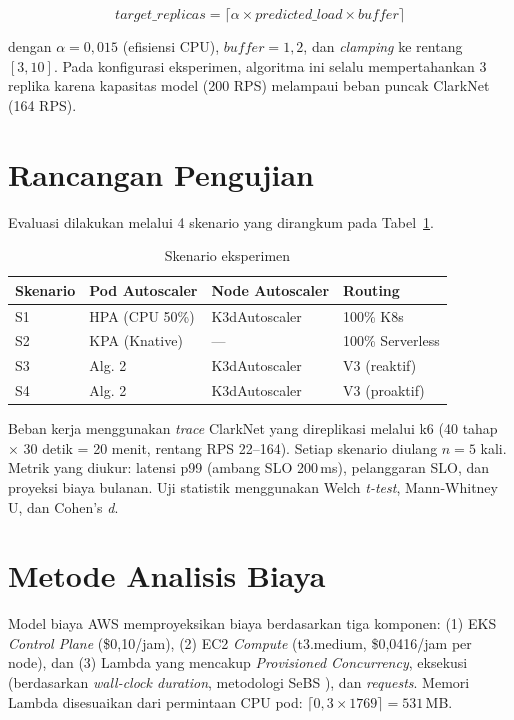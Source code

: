 \begin{equation}
    target\_replicas = \lceil \alpha \times predicted\_load \times buffer \rceil
\end{equation}

dengan $\alpha = 0,015$ (efisiensi CPU), $buffer = 1,2$, dan \emph{clamping} ke rentang $[3, 10]$. Pada konfigurasi eksperimen, algoritma ini selalu mempertahankan 3 replika karena kapasitas model (200 RPS) melampaui beban puncak ClarkNet (164 RPS).

\section{Rancangan Pengujian}
\label{sec:rancangan-pengujian}

Evaluasi dilakukan melalui 4 skenario yang dirangkum pada Tabel~\ref{tab:skenario-eksperimen}.

\begin{table}[htbp]
    \centering
    \caption{Skenario eksperimen}
    \label{tab:skenario-eksperimen}
    \begin{tabular}{llll}
        \toprule
        Skenario & Pod Autoscaler & Node Autoscaler & Routing \\
        \midrule
        S1 & HPA (CPU 50\%) & K3dAutoscaler & 100\% K8s \\
        S2 & KPA (Knative) & --- & 100\% Serverless \\
        S3 & Alg. 2 & K3dAutoscaler & V3 (reaktif) \\
        S4 & Alg. 2 & K3dAutoscaler & V3 (proaktif) \\
        \bottomrule
    \end{tabular}
\end{table}

Beban kerja menggunakan \emph{trace} ClarkNet yang direplikasi melalui k6 (40 tahap $\times$ 30 detik = 20 menit, rentang RPS 22--164). Setiap skenario diulang $n = 5$ kali. Metrik yang diukur: latensi p99 (ambang SLO 200\,ms), pelanggaran SLO, dan proyeksi biaya bulanan. Uji statistik menggunakan Welch \emph{t-test}, Mann-Whitney U, dan Cohen's \emph{d}.

\section{Metode Analisis Biaya}
\label{sec:metode-biaya}

Model biaya AWS memproyeksikan biaya berdasarkan tiga komponen: (1) EKS \emph{Control Plane} (\$0,10/jam), (2) EC2 \emph{Compute} (t3.medium, \$0,0416/jam per node), dan (3) Lambda yang mencakup \emph{Provisioned Concurrency}, eksekusi (berdasarkan \emph{wall-clock duration}, metodologi SeBS \citep{sebs2020}), dan \emph{requests}. Memori Lambda disesuaikan dari permintaan CPU pod: $\lceil 0,3 \times 1769 \rceil = 531$\,MB.

